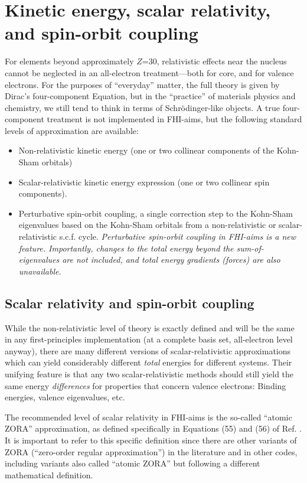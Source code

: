 \section{Kinetic energy, scalar relativity, and spin-orbit coupling}
\label{Sec:rel}

For elements beyond approximately $Z$=30, relativistic effects near
the nucleus cannot be neglected in an all-electron treatment---both
for core, and for valence electrons. For the purposes of ``everyday'' matter,
the full theory is given by Dirac's four-component Equation, but in the
``practice'' of materials physics and chemistry, we still tend to think in
terms of Schr\"odinger-like objects. A true four-component treatment is not
implemented in FHI-aims, but the following standard levels of approximation
are available: 
\begin{itemize}
  \item Non-relativistic kinetic energy (one or two collinear 
    components of the Kohn-Sham orbitals)
  \item Scalar-relativistic kinetic energy expression (one or two collinear
    spin components). 
  \item Perturbative spin-orbit coupling, a single correction step to the
    Kohn-Sham eigenvalues based on the Kohn-Sham orbitals from a
    non-relativistic or scalar-relativistic s.c.f. cycle. \emph{Perturbative
      spin-orbit coupling in FHI-aims is a new feature. Importantly,
      changes to the total  
      energy beyond the sum-of-eigenvalues are not included, and total energy 
      gradients (forces) are also unavailable.}
\end{itemize}

\subsection*{Scalar relativity and spin-orbit coupling}

While the non-relativistic level of theory is exactly
defined and will be the same in any first-principles implementation (at a
complete basis set, all-electron level anyway), there are many different
versions of scalar-relativistic approximations which can yield
considerably different \emph{total} energies for different systems. Their
unifying feature is that any two scalar-relativistic methods should still
yield the same energy \emph{differences} for properties that concern
valence electrons: Binding energies, valence eigenvalues, etc. 

The recommended level of scalar relativity in FHI-aims is the
so-called ``atomic ZORA'' approximation, as defined specifically in
Equations (55) and (56) of Ref. \cite{Blum08}. It is important to
refer to this specific definition since there are other variants of
ZORA (``zero-order regular approximation'') in the literature and in
other codes, including variants also called ``atomic ZORA'' but
following a different mathematical definition. 

